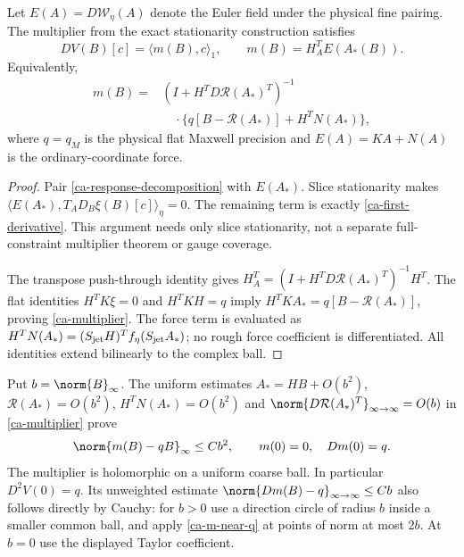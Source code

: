 \begin{proposition}\label{ca-envelope}
Let $E(A)=D\mathcal W_\eta(A)$ denote the Euler field under
the physical fine pairing. The multiplier from the exact
stationarity construction satisfies
\begin{equation}\label{ca-first-derivative}
 DV(B)[c]=\langle m(B),c\rangle_1,\qquad
 m(B)=H_A^TE(A_*(B)).
\end{equation}
Equivalently,
\begin{equation}\label{ca-multiplier}
 \begin{split}
 m(B)={}&(I+H^TD\mathcal R(A_*)^T)^{-1}\\
 &\quad\cdot\{q[B-\mathcal R(A_*)]+H^TN(A_*)\},
 \end{split}
\end{equation}
where $q=q_M$ is the physical flat Maxwell precision and
$E(A)=KA+N(A)$ is the ordinary-coordinate force.
\end{proposition}

\begin{proof}
Pair \eqref{ca-response-decomposition} with $E(A_*)$.
Slice stationarity makes
$\langle E(A_*),T_AD_B\xi(B)[c]\rangle_\eta=0$.
The remaining term is exactly \eqref{ca-first-derivative}.
This argument needs only slice stationarity, not a separate
full-constraint multiplier theorem or gauge coverage.

The transpose push-through identity gives
$H_A^T=(I+H^TD\mathcal R(A_*)^T)^{-1}H^T$.
The flat identities $H^TK\xi=0$ and $H^TKH=q$ imply
$H^TKA_*=q[B-\mathcal R(A_*)]$, proving
\eqref{ca-multiplier}. The force term is evaluated as
$H^TN(A_*)=(S_{\rm jet}H)^Tf_\eta(S_{\rm jet}A_*)$;
no rough force coefficient is differentiated. All identities
extend bilinearly to the complex ball.
\end{proof}

Put $b=\norm{B}_\infty$. The uniform estimates
$A_*=HB+O(b^2)$, $\mathcal R(A_*)=O(b^2)$,
$H^TN(A_*)=O(b^2)$ and
$\norm{D\mathcal R(A_*)^T}_{\infty\to\infty}=O(b)$
in \eqref{ca-multiplier} prove
\begin{equation}\label{ca-m-near-q}
 \norm{m(B)-qB}_\infty\le Cb^2,
 \qquad m(0)=0,\quad Dm(0)=q.
\end{equation}
The multiplier is holomorphic on a uniform coarse ball.
In particular $D^2V(0)=q$. Its unweighted estimate
$\norm{Dm(B)-q}_{\infty\to\infty}\le Cb$ also follows
directly by Cauchy: for $b>0$ use a direction circle of radius
$b$ inside a smaller common ball, and apply
\eqref{ca-m-near-q} at points of norm at most $2b$.
At $b=0$ use the displayed Taylor coefficient.

